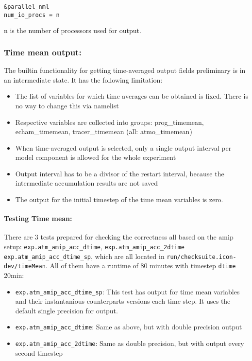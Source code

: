 \begin{verbatim}
&parallel_nml
num_io_procs = n
\end{verbatim}

n is the number of processors used for output.


\subsubsection{Time mean output:}
The builtin functionality for getting time-averaged output fields preliminary is in an intermediate state. It has the following limitation:
\begin{itemize}
  \item The list of variables for which time averages can be obtained is fixed. There is no way to change this via namelist
  \item Respective variables are collected into groups: prog\_timemean, echam\_timemean, tracer\_timemean (all: atmo\_timemean)
  \item When time-averaged output is selected, only a single output interval per model component is allowed for the whole experiment
  \item Output interval has to be a divisor of the restart interval, because the intermediate accumulation results are not saved
  \item The output for the initial timestep of the time mean variables is zero.
\end{itemize}

\paragraph{Testing Time mean:}
There are 3 tests prepared for checking the correctness all based on the amip setup: \texttt{exp.atm\_amip\_acc\_dtime}, \texttt{exp.atm\_amip\_acc\_2dtime} \texttt{exp.atm\_amip\_acc\_dtime\_sp}, which are all located in \texttt{run/checksuite.icon-dev/timeMean}. All of them have a runtime of 80 minutes with timestep \texttt{dtime} = 20min:
\begin{itemize}
  \item \texttt{exp.atm\_amip\_acc\_dtime\_sp}: This test has output for time mean variables and their instantanious counterparts versions each time step. It uses the default single precision for output.
  \item \texttt{exp.atm\_amip\_acc\_dtime}: Same as above, but with double precision output
  \item \texttt{exp.atm\_amip\_acc\_2dtime}: Same as double precision, but with output every second timestep
\end{itemize}

